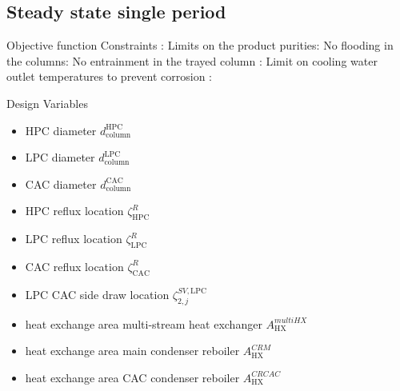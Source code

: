     \subsection{Steady state single period}
    \label{chp:optexample:ss_single_perid}
    Objective function
    Constraints :
    Limits on the product purities:
    No flooding in the columns:
    No entrainment in the trayed column :
    Limit on cooling water outlet temperatures to prevent corrosion :

    Design Variables
    \begin{itemize}
        \item HPC diameter $d_{\text{column}}^{\text{HPC}}$
        \item LPC diameter $d_{\text{column}}^{\text{LPC}}$
        \item CAC diameter $d_{\text{column}}^{\text{CAC}}$
        \item HPC reflux location $\zeta^R_{\text{HPC}}$
        \item LPC reflux location $\zeta^R_{\text{LPC}}$
        \item CAC reflux location $\zeta^R_{\text{CAC}}$
        \item LPC CAC side draw location $\zeta^{SV,\text{LPC}}_{2,j}$
        \item heat exchange area multi-stream heat exchanger $A_{\text{HX}}^{multiHX}$
        \item heat exchange area main condenser reboiler $A_{\text{HX}}^{CRM}$
        \item heat exchange area CAC condenser reboiler $A_{\text{HX}}^{CRCAC}$
    \end{itemize}

